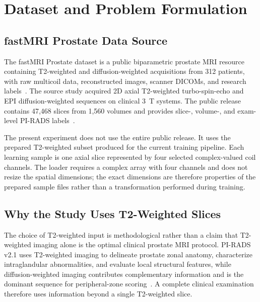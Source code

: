 \section{Dataset and Problem Formulation}\label{sec:data}
\subsection{fastMRI Prostate Data Source}
The fastMRI Prostate dataset is a public biparametric prostate MRI resource containing T2-weighted and diffusion-weighted acquisitions from 312 patients, with raw multicoil data, reconstructed images, scanner DICOMs, and research labels~\cite{Tibrewala2024FastMRIProstate}. The source study acquired 2D axial T2-weighted turbo-spin-echo and EPI diffusion-weighted sequences on clinical 3~T systems. The public release contains 47,468 slices from 1,560 volumes and provides slice-, volume-, and exam-level PI-RADS labels~\cite{Tibrewala2024FastMRIProstate}.

The present experiment does not use the entire public release. It uses the prepared T2-weighted subset produced for the current training pipeline. Each learning sample is one axial slice represented by four selected complex-valued coil channels. The loader requires a complex array with four channels and does not resize the spatial dimensions; the exact dimensions are therefore properties of the prepared sample files rather than a transformation performed during training.

\subsection{Why the Study Uses T2-Weighted Slices}\label{sec:why-t2}
The choice of T2-weighted input is methodological rather than a claim that T2-weighted imaging alone is the optimal clinical prostate MRI protocol. PI-RADS v2.1 uses T2-weighted imaging to delineate prostate zonal anatomy, characterize intraglandular abnormalities, and evaluate local structural features, while diffusion-weighted imaging contributes complementary information and is the dominant sequence for peripheral-zone scoring~\cite{Turkbey2019PIRADSv21}. A complete clinical examination therefore uses information beyond a single T2-weighted slice.

